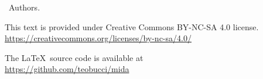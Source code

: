 \textcopyright \ Authors.

This text is provided under Creative Commons BY-NC-SA 4.0 license.\\
\url{https://creativecommons.org/licenses/by-nc-sa/4.0/}

The \LaTeX \ source code is available at\\
\url{https://github.com/teobucci/mida}